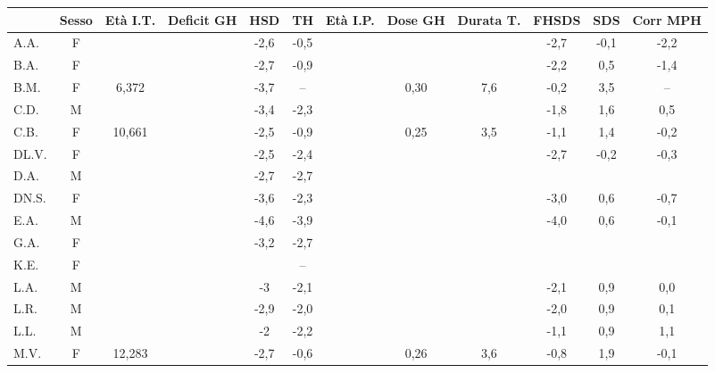 \begin{sidewaystable}
\centering
\begin{tabular}{lccccccccccc}
\toprule
 	& Sesso & Età I.T. & Deficit GH & HSD %
 	& TH %
 	& Età I.P.
 	& Dose GH
 	& Durata T.
 	& FHSDS
 	& \delta SDS
 	& Corr MPH
 	\\
\midrule                                
A.A.	& F	&          &  		&  -2,6 & -0,5  &  &  	  &      & -2,7  & -0,1 & -2,2                    \\
B.A.	& F	&          & \checkmark &  -2,7 & -0,9  &  &      &      & -2,2  & 0,5  & -1,4                    \\
B.M.	& F	&  6,372   & \checkmark &  -3,7 & --    &  & 0,30 &  7,6 & -0,2  & 3,5  & --                      \\
C.D.	& M	&          & \checkmark &  -3,4 & -2,3  &  &      &      & -1,8  & 1,6  & 0,5                     \\
C.B.	& F     & 10,661   &  		&  -2,5 & -0,9  &  & 0,25 &  3,5 & -1,1  & 1,4  & -0,2                           \\
DL.V.	& F	&          & \checkmark &  -2,5 & -2,4  &  &      &      & -2,7  & -0,2 & -0,3                    \\
D.A.	& M	&          &  		&  -2,7 & -2,7  &  &      &      &       &      &                                \\
DN.S.	& F	&          & \checkmark &  -3,6 & -2,3  &  &      &      & -3,0  & 0,6  & -0,7                    \\
E.A.	& M	&          &  		&  -4,6 & -3,9  &  &      &      & -4,0  & 0,6  & -0,1                           \\
G.A.	& F	&          &  		&  -3,2 & -2,7  &  &      &      &       &      &                                \\
K.E.	& F	&          &  		&       & --    &  &      &      &       &      &                                \\
L.A.	& M	&          & \checkmark &  -3   & -2,1  &  &      &      & -2,1  & 0,9  & 0,0                     \\
L.R.	& M	&          &  		&  -2,9 & -2,0  &  &      &      & -2,0  & 0,9  & 0,1                            \\
L.L.	& M	&          &  		&  -2   & -2,2  &  &      &      & -1,1  & 0,9  & 1,1                            \\
M.V.	& F	& 12,283   & \checkmark &  -2,7 & -0,6  &  & 0,26 &  3,6 & -0,8  & 1,9  & -0,1                    \\

\end{tabular}
\end{sidewaystable}
